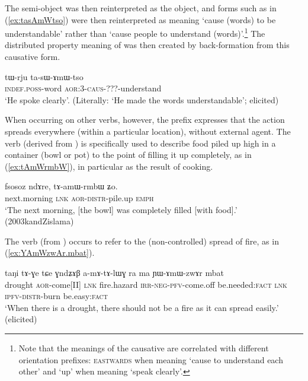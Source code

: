  
The semi-object was then reinterpreted as the object, and forms such as  in (\ref{ex:tasAmWtso}) were then reinterpreted as meaning `cause (words) to be understandable' rather than `cause people to understand (words)'.\footnote{Note that the meanings of the causative  are correlated with different orientation prefixes: \textsc{eastwards} when meaning `cause to understand each other' and `up' when meaning `speak clearly'. } The distributed property meaning of  was then created by back-formation from this causative form.

\begin{exe}
\ex \label{ex:tasAmWtso}
 \gll tɯ-rju ta-sɯ-ɤmɯ-tso \\
 \textsc{indef}.\textsc{poss}-word \textsc{aor}:3\flobv{}-\textsc{caus}-???-understand \\
 \glt `He spoke clearly'. (Literally: `He made the words understandable'; elicited)
 \end{exe}

When occurring on other verbs, however, the  prefix expresses that the action spreads everywhere (within a particular location), without external agent. The verb  (derived from ) is specifically used to describe food piled up high in a container (bowl or pot) to the point of filling it up completely, as in (\ref{ex:tAmWrmbW}), in particular as the result of cooking.
 
 \begin{exe}
\ex \label{ex:tAmWrmbW}
 \gll fsosoz ndɤre, tɤ-amɯ-rmbɯ ʑo. \\
 next.morning \textsc{lnk} \textsc{aor}-\textsc{distr}-pile.up \textsc{emph} \\
\glt `The next morning, [the bowl] was completely filled [with food].' (2003kandZislama)
 \end{exe}

The verb  (from ) occurs to refer to the (non-controlled) spread of fire, as in (\ref{ex:YAmWzwAr.mbat}).  

 \begin{exe}
\ex \label{ex:YAmWzwAr.mbat}
 \gll taŋi tɤ-ɣe tɕe ɣndʑɤβ a-mɤ-tɤ-lɯɣ ra ma ɲɯ-ɤmɯ-zwɤr mbat \\
 drought \textsc{aor}-come[II] \textsc{lnk} fire.hazard \textsc{irr}-\textsc{neg}-\textsc{pfv}-come.off be.needed:\textsc{fact} \textsc{lnk} \textsc{ipfv}-\textsc{distr}-burn be.easy:\textsc{fact} \\
 \glt  `When there is a drought, there should not be a fire as it can spread easily.' (elicited)
  \end{exe}

